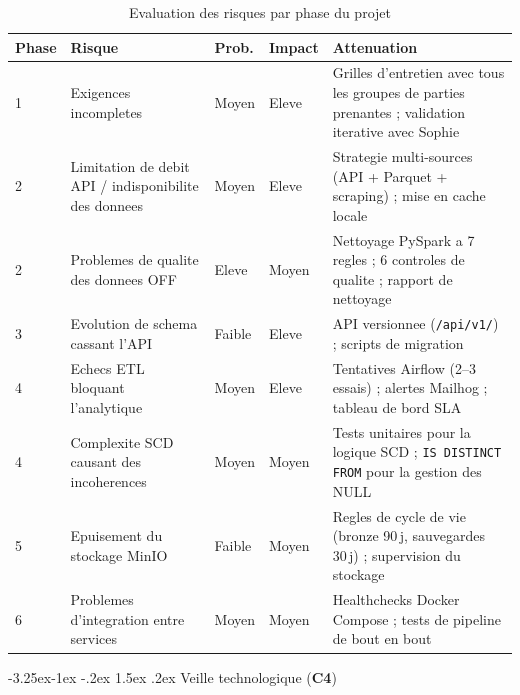 \documentclass[a4paper,11pt,oneside,openany]{report}
\makeatletter
\renewcommand\subsection{\@startsection{subsection}{2}{\z@}%
  {-3.25ex\@plus -1ex \@minus -.2ex}%
  {1.5ex \@plus .2ex}%
  {\normalfont\large\bfseries\color{ntdarkgreen}}}
\newcommand{\competence}[1]{\textbf{\textcolor{ntgreen}{#1}}}
\makeatother
\begin{document}
\begin{table}[H]
\centering
\caption{Evaluation des risques par phase du projet}
\label{tab:risks}
\begin{tabularx}{\textwidth}{C{1cm} L{3.5cm} C{1.2cm} C{1.2cm} L{4.5cm}}
\toprule
\textbf{Phase} & \textbf{Risque} & \textbf{Prob.} & \textbf{Impact} & \textbf{Attenuation} \\
 & Exigences incompletes & Moyen & Eleve & Grilles d'entretien avec tous les groupes de parties prenantes ; validation iterative avec Sophie \\
2 & Limitation de debit API / indisponibilite des donnees & Moyen & Eleve & Strategie multi-sources (API + Parquet + scraping) ; mise en cache locale \\
2 & Problemes de qualite des donnees OFF & Eleve & Moyen & Nettoyage PySpark a 7 regles ; 6 controles de qualite ; rapport de nettoyage \\
3 & Evolution de schema cassant l'API & Faible & Eleve & API versionnee (\texttt{/api/v1/}) ; scripts de migration \\
4 & Echecs ETL bloquant l'analytique & Moyen & Eleve & Tentatives Airflow (2--3 essais) ; alertes Mailhog ; tableau de bord SLA \\
4 & Complexite SCD causant des incoherences & Moyen & Moyen & Tests unitaires pour la logique SCD ; \texttt{IS DISTINCT FROM} pour la gestion des NULL \\
5 & Epuisement du stockage MinIO & Faible & Moyen & Regles de cycle de vie (bronze 90\,j, sauvegardes 30\,j) ; supervision du stockage \\
6 & Problemes d'integration entre services & Moyen & Moyen & Healthchecks Docker Compose ; tests de pipeline de bout en bout \\
\bottomrule
\end{tabularx}
\end{table}

\subsection{Veille technologique (\competence{C4})}
\end{document}
